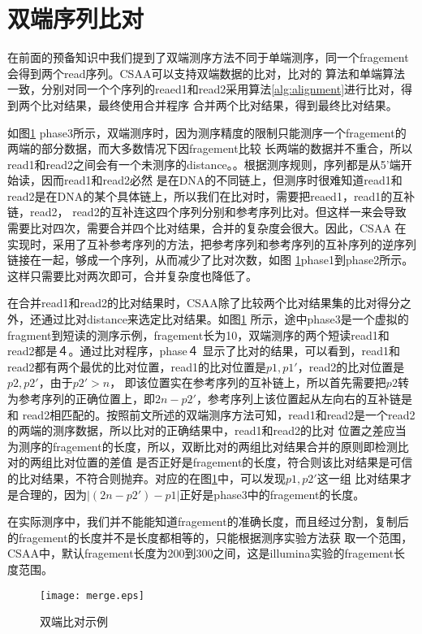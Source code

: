 \section{双端序列比对}
在前面的预备知识中我们提到了双端测序方法不同于单端测序，同一个fragement会得到两个read序列。CSAA可以支持双端数据的比对，比对的
算法和单端算法一致，分别对同一个个序列的reaed1和read2采用算法\ref{alg:alignment}进行比对，得到两个比对结果，最终使用合并程序
合并两个比对结果，得到最终比对结果。

如图\ref{fig:merge} phase3所示，双端测序时，因为测序精度的限制只能测序一个fragement的两端的部分数据，而大多数情况下因fragement比较
长两端的数据并不重合，所以read1和read2之间会有一个未测序的distance。。根据测序规则，序列都是从5'端开始读，因而read1和read2必然
是在DNA的不同链上，但测序时很难知道read1和read2是在DNA的某个具体链上，所以我们在比对时，需要把reaed1，read1的互补链，read2，
read2的互补连这四个序列分别和参考序列比对。但这样一来会导致需要比对四次，需要合并四个比对结果，合并的复杂度会很大。因此，CSAA
在实现时，采用了互补参考序列的方法，把参考序列和参考序列的互补序列的逆序列链接在一起，够成一个序列，从而减少了比对次数，如图
\ref{fig:merge}phase1到phase2所示。这样只需要比对两次即可，合并复杂度也降低了。

在合并read1和read2的比对结果时，CSAA除了比较两个比对结果集的比对得分之外，还通过比对distance来选定比对结果。如图\ref{fig:merge}
所示，途中phase3是一个虚拟的fragment到短读的测序示例，fragement长为10，双端测序的两个短读read1和read2都是４。通过比对程序，phase４
显示了比对的结果，可以看到，read1和read2都有两个最优的比对位置，read1的比对位置是$p1,p1'$，read2的比对位置是$p2,p2'$，由于$p2'>n$，
即该位置实在参考序列的互补链上，所以首先需要把$p2$转为参考序列的正确位置上，即$2n-p2'$，参考序列上该位置起从左向右的互补链是和
read2相匹配的。按照前文所述的双端测序方法可知，read1和read2是一个read2的两端的测序数据，所以比对的正确结果中，read1和read2的比对
位置之差应当为测序的fragement的长度，所以，双断比对的两组比对结果合并的原则即检测比对的两组比对位置的差值
是否正好是fragement的长度，符合则该比对结果是可信的比对结果，不符合则抛弃。对应的在图\ref{fig:merge}中，可以发现$p1,p2'$这一组
比对结果才是合理的，因为$|(2n-p2')-p1|$正好是phase3中的fragement的长度。

在实际测序中，我们并不能能知道fragement的准确长度，而且经过分割，复制后的fragement的长度并不是长度都相等的，只能根据测序实验方法获
取一个范围，CSAA中，默认fragement长度为200到300之间，这是illumina实验的fragement长度范围。

\begin{figure}[htbp]
    \centering
    \texttt{[image: merge.eps]}
    \caption{双端比对示例} \label{fig:merge}
\end{figure}


